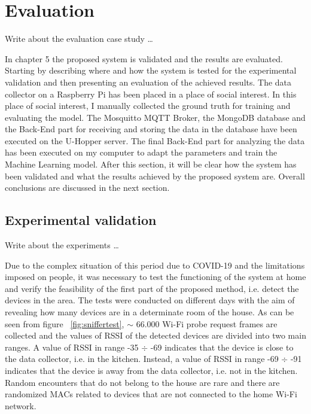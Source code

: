 \chapter{Evaluation}
\label{cha:evaluation}
\vspace{0.4 cm} 

Write about the evaluation case study \dots

In chapter 5 the proposed system is validated and the results are evaluated.
Starting by describing where and how the system is tested for the experimental validation and then presenting an evaluation of the achieved results. The data collector on a Raspberry Pi has been placed in a place of social interest. In this place of social interest, I manually collected the ground truth for training and evaluating the model. The Mosquitto MQTT Broker, the MongoDB database and the Back-End part for receiving and storing the data in the database have been executed on the U-Hopper server. The final Back-End part for analyzing the data has been executed on my computer to adapt the parameters and train the Machine Learning model. After this section, it will be clear how the system has been validated and what the results achieved by the proposed system are. Overall conclusions are discussed in the next section.


\section{Experimental validation}
\label{sec:expval}
\vspace{0.2 cm} 

Write about the experiments \dots

Due to the complex situation of this period due to COVID-19 and the limitations imposed on people, it was necessary to test the functioning of the system at home and verify the feasibility of the first part of the proposed method, i.e. detect the devices in the area. The tests were conducted on different days with the aim of revealing how many devices are in a determinate room of the house. As can be seen from figure ~\ref{fig:sniffertest}, $\sim$ 66.000 Wi-Fi probe request frames are collected and the values of RSSI of the detected devices are divided into two main ranges. A value of RSSI in range -35 $\div$ -69 indicates that the device is close to the data collector, i.e. in the kitchen. Instead, a value of RSSI in range -69 $\div$ -91 indicates that the device is away from the data collector, i.e. not in the kitchen. Random encounters that do not belong to the house are rare and there are randomized MACs related to devices that are not connected to the home Wi-Fi network.

